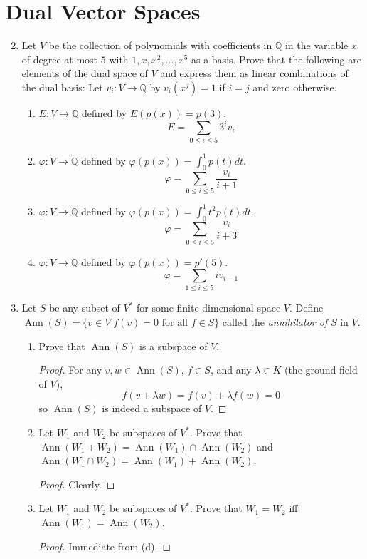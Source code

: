 \documentclass{report}
\newcommand{\Q}{\mathbb{Q}}
\DeclareMathOperator{\An}{Ann}
\begin{document}
\section{Dual Vector Spaces}
\begin{enumerate} 
	\setcounter{enumi}{1}
	\item Let $V$ be the collection of polynomials with coefficients in $\Q$ in the variable $x$ of degree at most $5$ with $1,x,x^2,...,x^5$ as a basis.
		Prove that the following are elements of the dual space of $V$ and express them as linear combinations of the dual basis:
		Let $v_i:V\to \Q$ by $v_i(x^j)=1$ if $i=j$ and zero otherwise.
		\begin{enumerate} [label=(\alph*)]
			\item $E:V\to\Q$ defined by $E(p (x))=p (3)$.
				$$E=\sum_{0\leq i \leq 5}3^iv_i$$
			\item $\varphi: V\to\Q$ defined by $\varphi(p(x))=\int_0^1p (t)dt$.
				$$\varphi=\sum_{0\leq i \leq 5}\frac{v_i}{i+1}$$
			\item $\varphi:V\to\Q$ defined by $\varphi(p (x))=\int_{0}^1 t^2p (t)dt$.
				$$\varphi=\sum_{0\leq i \leq 5}\frac{v_i}{i+3}$$
			\item $\varphi:V\to\Q$ defined by $\varphi(p (x))=p'(5)$.
				$$\varphi=\sum_{1\leq i\leq 5}iv_{i-1}$$
		\end{enumerate}
	\item Let $S$ be any subset of $V^*$ for some finite dimensional space $V$. Define $\An(S)=\{v\in V | f(v)=0 \text{ for all } f\in S\}$ called the \textit{annihilator of} $S$ in $V$.
		\begin{enumerate} [label=(\alph*)]
			\item Prove that $\An(S)$ is a subspace of $V$.
				\begin{proof}
					For any $v,w\in\An(S)$, $f\in S$, and any $\lambda\in K$ (the ground field of $V$), 
					$$f(v+\lambda w)=f(v)+\lambda f(w)=0$$
					so $\An(S)$ is indeed a subspace of $V$.
				\end{proof}
			\item Let $W_1$ and $W_2$ be subspaces of $V^*$. Prove that $\An(W_1+W_2)=\An(W_1)\cap \An(W_2)$ and $\An(W_1\cap W_2)=\An(W_1)+\An(W_2)$.
				\begin{proof}
					Clearly.
				\end{proof}
			\item Let $W_1$ and $W_2$ be subspaces of $V^*$. Prove that $W_1=W_2$ iff $\An(W_1)=\An(W_2)$.
				\begin{proof}
					Immediate from (d).

\end{proof}
\end{enumerate}
\end{enumerate}
\end{document}
